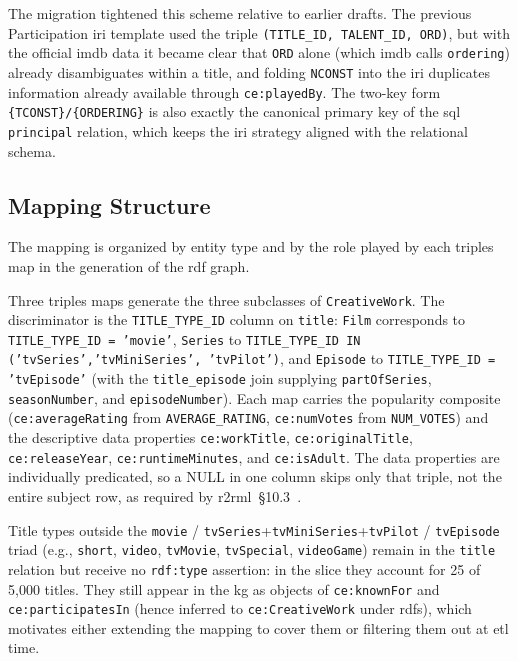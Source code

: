 The migration tightened this scheme relative to earlier drafts. The previous Participation \ac{iri} template used the triple \texttt{(TITLE\_ID, TALENT\_ID, ORD)}, but with the official \ac{imdb} data it became clear that \texttt{ORD} alone (which \ac{imdb} calls \texttt{ordering}) already disambiguates within a title, and folding \texttt{NCONST} into the \ac{iri} duplicates information already available through \texttt{ce:playedBy}. The two-key form \texttt{\{TCONST\}/\{ORDERING\}} is also exactly the canonical primary key of the \ac{sql} \texttt{principal} relation, which keeps the \ac{iri} strategy aligned with the relational schema.

\subsection{Mapping Structure}

The mapping is organized by entity type and by the role played by each triples map in the generation of the \ac{rdf} graph.

\begin{sloppypar}
Three triples maps generate the three subclasses of \texttt{CreativeWork}. The discriminator is the \texttt{TITLE\_TYPE\_ID} column on \texttt{title}: \texttt{Film} corresponds to \texttt{TITLE\_TYPE\_ID = 'movie'}, \texttt{Series} to \texttt{TITLE\_TYPE\_ID IN ('tvSeries',\allowbreak{}'tvMiniSeries', 'tvPilot')}, and \texttt{Episode} to \texttt{TITLE\_TYPE\_ID = 'tvEpisode'} (with the \texttt{title\_episode} join supplying \texttt{partOfSeries}, \texttt{seasonNumber}, and \texttt{episodeNumber}). Each map carries the popularity composite (\texttt{ce:averageRating} from \texttt{AVERAGE\_RATING}, \texttt{ce:numVotes} from \texttt{NUM\_VOTES}) and the descriptive data properties \texttt{ce:workTitle}, \texttt{ce:originalTitle}, \texttt{ce:releaseYear}, \texttt{ce:runtimeMinutes}, and \texttt{ce:isAdult}. The data properties are individually predicated, so a NULL in one column skips only that triple, not the entire subject row, as required by \ac{r2rml}~\S10.3~\cite{r2rml}.
\end{sloppypar}

Title types outside the \texttt{movie} / \texttt{tvSeries}+\texttt{tvMiniSeries}+\texttt{tvPilot} / \texttt{tvEpisode} triad (e.g., \texttt{short}, \texttt{video}, \texttt{tvMovie}, \texttt{tvSpecial}, \texttt{videoGame}) remain in the \texttt{title} relation but receive no \texttt{rdf:type} assertion: in the slice they account for 25 of 5{,}000 titles. They still appear in the \ac{kg} as objects of \texttt{ce:knownFor} and \texttt{ce:participatesIn} (hence inferred to \texttt{ce:CreativeWork} under \ac{rdfs}), which motivates either extending the mapping to cover them or filtering them out at \ac{etl} time.

